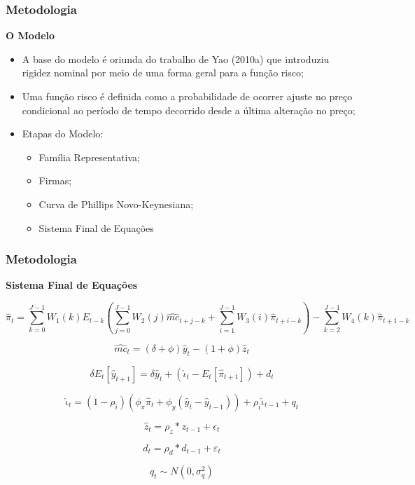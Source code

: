 \documentclass[aspectratio=169]{beamer}
\begin{document}
\begin{frame}\frametitle{Metodologia}
  \textbf{O Modelo}
  \begin{itemize}
  \item A base do modelo é oriunda do trabalho de Yao (2010a) que introduziu rigidez nominal por meio de uma forma geral para a função risco;
  \item Uma função risco é definida como a probabilidade de ocorrer ajuste no preço condicional ao período de tempo decorrido desde a última alteração no preço;
  \item Etapas do Modelo:
    \begin{itemize}
    \item Família Representativa;
    \item Firmas;
    \item Curva de Phillips Novo-Keynesiana;
    \item Sistema Final de Equações
    \end{itemize}
  \end{itemize}
\end{frame}

\begin{frame}[shrink=20]\frametitle{Metodologia}
  \textbf{Sistema Final de Equações}

\begin{equation}
{\hat{\pi}}_{t}=\sum_{k=0}^{J-1}{{W}_{1}(k)}{E}_{t-k}(\sum_{j=0}^{J-1}{{W}_{2}(j){\hat{mc}}_{t+j-k}+\sum_{i=1}^{J-1}{{W}_{3}(i){\hat{\pi}}_{t+i-k}}})-\sum_{k=2}^{J-1}{{W}_{4}(k){\hat{\pi}}_{t+1-k}} 
\end{equation}

\begin{equation}
{\hat{mc}}_{t}=(\delta +\phi){\hat{y}}_{t}-(1+\phi){\hat{z}}_{t}
\end{equation}

\begin{equation}
\delta{E}_{t}[{\hat{y}}_{t+1}]=\delta{\hat{y}}_{t}+({\hat{\iota}}_{t}-{E}_{t}[{\hat{\pi}}_{t+1}])+{d}_{t}
\end{equation}

\begin{equation}
{\hat{\iota}}_{t}=(1-{\rho}_{i})({\phi}_{\pi}{\hat{\pi}}_{t}+{\phi}_{y}({\hat{y}}_{t}-{\hat{y}}_{t-1}))+{\rho}_{i}{\hat{\iota}}_{t-1}+{q}_{t}
\end{equation}

\begin{equation}
{\hat{z}}_{t}={\rho}_{z}\ast {z}_{t-1}+{\epsilon}_{t}
\end{equation}

\begin{equation}
{d}_{t}={\rho}_{d}\ast {d}_{t-1}+{\varepsilon}_{t}
\end{equation}

\begin{equation}
{q}_{t}\sim N\left(0,{\sigma}_{q}^{2}\right) 
\end{equation}  
\end{frame}
\end{document}
